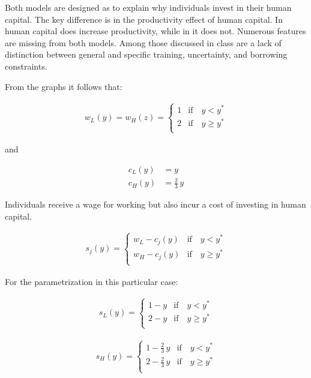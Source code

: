 \begin{boenumerate}
\item Both models are designed as to explain why individuals invest in their human capital. The key difference is in the productivity effect of human capital. In \cite{Ben-Porath.1967} human capital does increase productivity, while in \cite{Spence.1973} it does not. Numerous features are missing from both models. Among those discussed in class are a lack of distinction between general and specific training, uncertainty, and borrowing constraints.

\item From the graphs it follows that:

\begin{align*}
w_L(y) = w_H(z) = \begin{cases}
1 & \text{if}\quad y < y^*  \\
2  & \text{if}\quad y \geq y^*  \\
\end{cases}
\end{align*}

and

\begin{align*}
c_L(y) & = y           \\
c_H(y) & = \tfrac{2}{3}\, y
\end{align*}

\item Individuals receive a wage for working but also incur a cost of investing in human capital.

\begin{align*}
s_j(y) = \begin{cases}
w_L - c_j(y) & \text{if}\quad y < y^*  \\
w_H - c_j(y) & \text{if}\quad y \geq y^*  \\
\end{cases}
\end{align*}

For the parametrization in this particular case:

\begin{align*}
s_L(y) = \begin{cases}
1 - y & \text{if}\quad y < y^*  \\
2 - y & \text{if}\quad y \geq y^*  \\
\end{cases}
\end{align*}

\begin{align*}
s_H(y) = \begin{cases}
1 - \tfrac{2}{3}\,y & \text{if}\quad y < y^*  \\
2 - \tfrac{2}{3}\,y & \text{if}\quad y \geq y^*  \\
\end{cases}
\end{align*}



\end{boenumerate}
